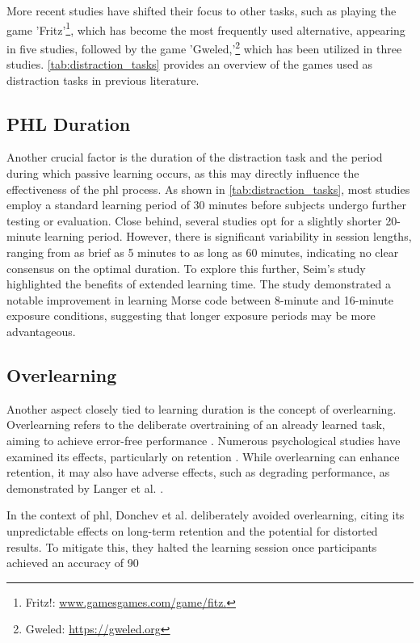 More recent studies have shifted their focus to other tasks, such as playing the game 'Fritz'\footnote{Fritz!: \url{www.gamesgames.com/game/fitz.}}, which has become the most frequently used alternative, appearing in five studies, followed by the game 'Gweled,'\footnote{Gweled: \url{https://gweled.org}} which has been utilized in three studies. \autoref{tab:distraction_tasks} provides an overview of the games used as distraction tasks in previous literature.

\subsection*{PHL Duration}
Another crucial factor is the duration of the distraction task and the period during which passive learning occurs, as this may directly influence the effectiveness of the \gls{phl} process. As shown in \autoref{tab:distraction_tasks}, most studies employ a standard learning period of 30 minutes before subjects undergo further testing or evaluation. Close behind, several studies opt for a slightly shorter 20-minute learning period. However, there is significant variability in session lengths, ranging from as brief as 5 minutes to as long as 60 minutes, indicating no clear consensus on the optimal duration. To explore this further, Seim's study \cite{Seim2018} highlighted the benefits of extended learning time. The study demonstrated a notable improvement in learning Morse code between 8-minute and 16-minute exposure conditions, suggesting that longer exposure periods may be more advantageous.

\subsection*{Overlearning}
Another aspect closely tied to learning duration is the concept of overlearning. Overlearning refers to the deliberate overtraining of an already learned task, aiming to achieve error-free performance \cite{Krueger1929}. Numerous psychological studies have examined its effects, particularly on retention \cite{Krueger1929, Driskell1992}. While overlearning can enhance retention, it may also have adverse effects, such as degrading performance, as demonstrated by Langer et al. \cite{Langer1979}.

In the context of \gls{phl}, Donchev et al. \cite{Donchev2021} deliberately avoided overlearning, citing its unpredictable effects on long-term retention and the potential for distorted results. To mitigate this, they halted the learning session once participants achieved an accuracy of 90%

